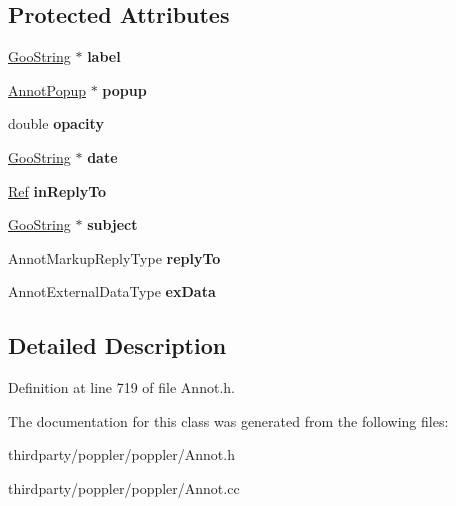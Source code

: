 \subsection*{Protected Attributes}
\begin{DoxyCompactItemize}
\item 
\mbox{\label{class_annot_markup_a76bd4008c4eafa2f5fe827ecc0a9df3d}} 
\hyperlink{class_goo_string}{Goo\+String} $\ast$ {\bfseries label}
\item 
\mbox{\label{class_annot_markup_a9f45ee49a92e04c47777246cf3d69ab2}} 
\hyperlink{class_annot_popup}{Annot\+Popup} $\ast$ {\bfseries popup}
\item 
\mbox{\label{class_annot_markup_a7dd8936842eab6a45786dfa67f2e2af2}} 
double {\bfseries opacity}
\item 
\mbox{\label{class_annot_markup_a9fe1fc1f6aa12ea674d89eac16b39139}} 
\hyperlink{class_goo_string}{Goo\+String} $\ast$ {\bfseries date}
\item 
\mbox{\label{class_annot_markup_aacdbf8399ef20e8f179d6da9996c855c}} 
\hyperlink{struct_ref}{Ref} {\bfseries in\+Reply\+To}
\item 
\mbox{\label{class_annot_markup_a44f74d7a7630d68a8949a1a480cbf0ac}} 
\hyperlink{class_goo_string}{Goo\+String} $\ast$ {\bfseries subject}
\item 
\mbox{\label{class_annot_markup_acf8721d60f733c8b0fd9772c3c71d5ae}} 
Annot\+Markup\+Reply\+Type {\bfseries reply\+To}
\item 
\mbox{\label{class_annot_markup_a2f1baf1f8ca022952a62ffe135f851cf}} 
Annot\+External\+Data\+Type {\bfseries ex\+Data}
\end{DoxyCompactItemize}


\subsection{Detailed Description}


Definition at line 719 of file Annot.\+h.



The documentation for this class was generated from the following files\+:\begin{DoxyCompactItemize}
\item 
thirdparty/poppler/poppler/Annot.\+h\item 
thirdparty/poppler/poppler/Annot.\+cc\end{DoxyCompactItemize}

